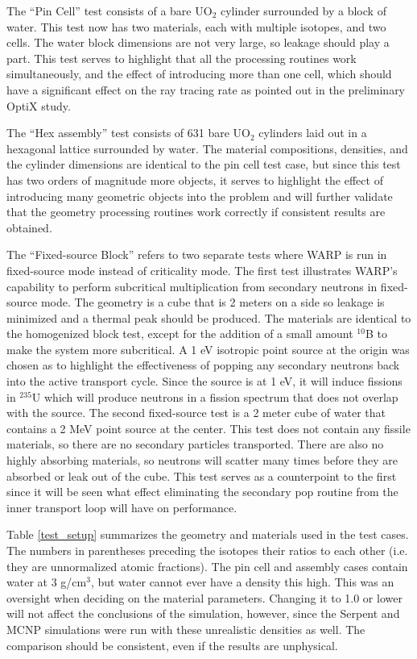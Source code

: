 The ``Pin Cell'' test consists of a bare UO$_2$ cylinder surrounded by a block of water.  This test now has two materials, each with multiple isotopes, and two cells.  The water block dimensions are not very large, so leakage should play a part.  This test serves to highlight that all the processing routines work simultaneously, and the effect of introducing more than one cell, which should have a significant effect on the ray tracing rate as pointed out in the preliminary OptiX study.

The ``Hex assembly'' test consists of 631 bare UO$_2$ cylinders laid out in a hexagonal lattice surrounded by water.  The material compositions, densities, and the cylinder dimensions are identical to the pin cell test case, but since this test has two orders of magnitude more objects, it serves to highlight the effect of introducing many geometric objects into the problem and will further validate that the geometry processing routines work correctly if consistent results are obtained.

The ``Fixed-source Block'' refers to two separate tests where WARP is run in fixed-source mode instead of criticality mode. The first test illustrates WARP's capability to perform subcritical multiplication from secondary neutrons in fixed-source mode.  The geometry is a cube that is 2 meters on a side so leakage is minimized and a thermal peak should be produced.  The materials are identical to the homogenized block test, except for the addition of a small amount $^{10}$B to make the system more subcritical.   A 1 eV isotropic point source at the origin was chosen as to highlight the effectiveness of popping any secondary neutrons back into the active transport cycle.  Since the source is at 1 eV, it will induce fissions in $^{235}$U which will produce neutrons in a fission spectrum that does not overlap with the source.  The second fixed-source test is a 2 meter cube of water that contains a 2 MeV point source at the center.  This test does not contain any fissile materials, so there are no secondary particles transported. There are also no highly absorbing materials, so neutrons will scatter many times before they are absorbed or leak out of the cube.  This test serves as a counterpoint to the first since it will be seen what effect eliminating the secondary pop routine from the inner transport loop will have on performance.

Table \ref{test_setup} summarizes the geometry and materials used in the test cases.  The numbers in parentheses preceding the isotopes their ratios to each other (i.e. they are unnormalized atomic fractions).  The pin cell and assembly cases contain water at 3 g/cm$^3$, but water cannot ever have a density this high.  This was an oversight when deciding on the material parameters.  Changing it to 1.0 or lower will not affect the conclusions of the simulation, however, since the Serpent and MCNP simulations were run with these unrealistic densities as well.  The comparison should be consistent, even if the results are unphysical.

